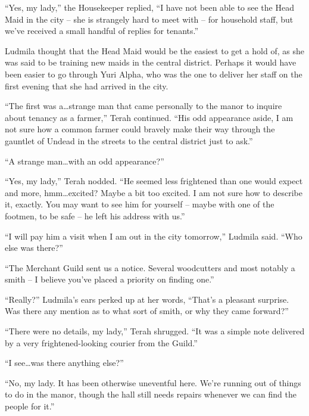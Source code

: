  

“Yes, my lady,” the Housekeeper replied, “I have not been able to see the Head Maid in the city – she is strangely hard to meet with – for household staff, but we’ve received a small handful of replies for tenants.”

 

Ludmila thought that the Head Maid would be the easiest to get a hold of, as she was said to be training new maids in the central district. Perhaps it would have been easier to go through Yuri Alpha, who was the one to deliver her staff on the first evening that she had arrived in the city.

 

“The first was a…strange man that came personally to the manor to inquire about tenancy as a farmer,” Terah continued. “His odd appearance aside, I am not sure how a common farmer could bravely make their way through the gauntlet of Undead in the streets to the central district just to ask.”

 

“A strange man…with an odd appearance?”

 

“Yes, my lady,” Terah nodded. “He seemed less frightened than one would expect and more, hmm…excited? Maybe a bit too excited. I am not sure how to describe it, exactly. You may want to see him for yourself – maybe with one of the footmen, to be safe – he left his address with us.”

 

“I will pay him a visit when I am out in the city tomorrow,” Ludmila said. “Who else was there?”

 

“The Merchant Guild sent us a notice. Several woodcutters and most notably a smith – I believe you’ve placed a priority on finding one.”

 

“Really?” Ludmila’s ears perked up at her words, “That’s a pleasant surprise. Was there any mention as to what sort of smith, or why they came forward?”

 

“There were no details, my lady,” Terah shrugged. “It was a simple note delivered by a very frightened-looking courier from the Guild.”

 

“I see…was there anything else?”

 

“No, my lady. It has been otherwise uneventful here. We’re running out of things to do in the manor, though the hall still needs repairs whenever we can find the people for it.”

